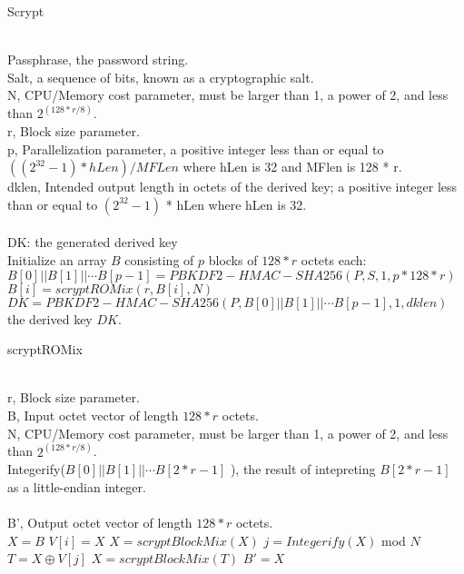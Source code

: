 \begin{algorithm}[tbp]\footnotesize
\caption{Scrypt}
\label{Scrypt}
  	\begin{algorithmic}[1]
	    \REQUIRE ~~\\ 
	    Passphrase, the password string.\\
		Salt, a sequence of bits, known as a cryptographic salt.\\
		N, CPU/Memory cost parameter, must be larger than 1, a power of 2,
		 and less than $2^{(128 * r / 8)}$.\\
		r, Block size parameter.\\
		p, Parallelization parameter, a positive integer less than or equal 
		to $((2^{32}-1) * hLen) / MFLen$ where hLen is 32 and MFlen is 128 * r.\\
		dklen, Intended output length in octets of the derived key; 
		a positive integer less than or equal to $(2^{32} - 1)$ * hLen where hLen is 32.\\
	    \ENSURE ~~\\
	    DK: the generated derived key\\
	    \STATE Initialize an array $B$ consisting of $p$ blocks of $128 * r$ octets each:\\
			$B[0]||B[1]||\cdots B[p-1]=PBKDF2-HMAC-SHA256(P,S,1,p*128*r)$
			\STATE $B[i]= scryptROMix(r,B[i],N)$   
		\ENDFOR 
		\STATE $DK=PBKDF2-HMAC-SHA256(P,B[0]||B[1]||\cdots B[p-1],1,dklen)$
		\RETURN the derived key $DK$.		
    \end{algorithmic}
\end{algorithm}
 
\begin{algorithm}[tbp]\footnotesize
\caption{scryptROMix}
\label{scryptROMix}
  	\begin{algorithmic}[1]
	    \REQUIRE ~~\\ 
	    r, Block size parameter.\\
		B, Input octet vector of length $128 * r$ octets.\\
		N, CPU/Memory cost parameter, must be larger than 1,
		 a power of 2, and less than $2^{(128 * r / 8)}$.\\
		Integerify($B[0]||B[1]||\cdots B[2*r-1]$ ), 
		the result of intepreting $B[2*r-1]$ as a little-endian integer.\\
	    \ENSURE ~~\\
	    B', Output octet vector of length $128 * r$ octets.\\
	    \STATE $X = B$
			\STATE $V[i]=X$  
			\STATE $X=scryptBlockMix(X)$  
 		\ENDFOR 
			\STATE $j=Integerify(X)$ mod $N$  
			\STATE $T=X \oplus V[j]$  
			\STATE $X=scryptBlockMix(T)$  
		\ENDFOR
		\RETURN $B'=X$	
    \end{algorithmic}
\end{algorithm}


